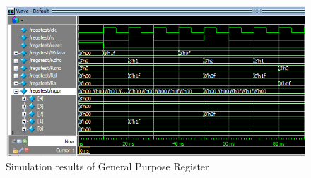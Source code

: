 \begin{figure}[H]
		\centering
		\includegraphics[width = \textwidth]{Figures/GPR}		
		\caption{Simulation results of General Purpose Register}
		\label {fig:GPRtest}
\end{figure}

